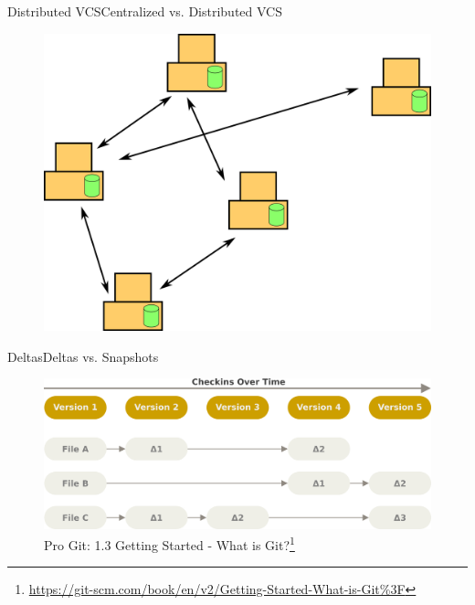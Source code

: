 \documentclass[aspectratio=169]{beamer}
\begin{document}
\begin{frame}{Distributed VCS}{Centralized vs. Distributed VCS}
\begin{figure}
    \centering
    \includegraphics[width=\textwidth,height=0.6\textheight,keepaspectratio]{02_distributed_vcs}
\end{figure}
\end{frame}

\begin{frame}{Deltas}{Deltas vs. Snapshots}
\begin{figure}
    \centering
    \includegraphics[width=\textwidth,height=0.6\textheight,keepaspectratio]{deltas}
    \caption{
        Pro Git: 1.3 Getting Started - What is Git?\footnote{\url{https://git-scm.com/book/en/v2/Getting-Started-What-is-Git\%3F}}
    }
\end{figure}
\end{frame}
\end{document}
